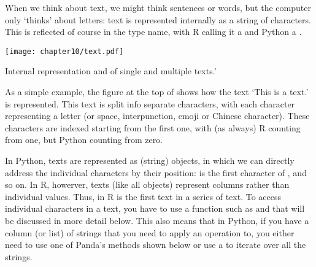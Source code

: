 
When we think about text, we might think sentences or words, but the computer only `thinks' about letters:
text is represented internally as a string of characters.
This is reflected of course in the type name, with R calling it a  and Python a .

\begin{ccsexample}
  \begin{center} \texttt{[image: chapter10/text.pdf]}\end{center}
  

  \caption{Internal representation and of single and multiple texts.'}\label{ex:text}
\end{ccsexample}

As a simple example, the figure at the top of  shows how the text `This is a text.' is represented.
This text is split info separate characters, with each character representing a letter (or space, interpunction, emoji or Chinese character).
These characters are indexed starting from the first one, with (as always) R counting from one, but Python counting from zero.

In Python, texts are represented as  (string) objects, in which we can directly address the individual characters by their position:  is the first character of , and so on.
In R, howerver, texts (like all objects) represent columns rather than individual values.
Thus,  in R is the first text in a series of text.
To access individual characters in a text, you have to use a function such as  and  that will be discussed in more detail below. 
This also means that in Python, if you have a column (or list) of strings that you need to apply an operation to,
you either need to use one of Panda's methods shown below or use a  to iterate over all the strings.

